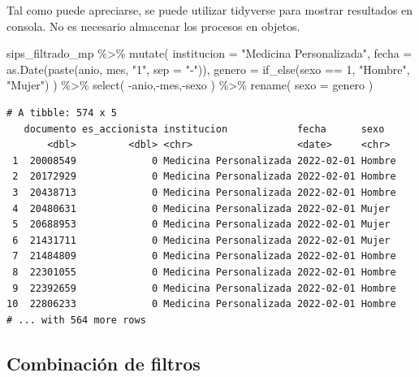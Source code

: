 \documentclass[
  letterpaper,
  DIV=11,
  numbers=noendperiod]{scrreprt}
\newenvironment{Shaded}{\begin{snugshade}}{\end{snugshade}}
\newcommand{\AttributeTok}[1]{\textcolor[rgb]{0.40,0.45,0.13}{#1}}
\newcommand{\DecValTok}[1]{\textcolor[rgb]{0.68,0.00,0.00}{#1}}
\newcommand{\FunctionTok}[1]{\textcolor[rgb]{0.28,0.35,0.67}{#1}}
\newcommand{\NormalTok}[1]{\textcolor[rgb]{0.00,0.23,0.31}{#1}}
\newcommand{\SpecialCharTok}[1]{\textcolor[rgb]{0.37,0.37,0.37}{#1}}
\newcommand{\StringTok}[1]{\textcolor[rgb]{0.13,0.47,0.30}{#1}}
\begin{document}
Tal como puede apreciarse, se puede utilizar tidyverse para mostrar
resultados en consola. No es necesario almacenar los procesos en
objetos.

\begin{Shaded}
\begin{Highlighting}[]
\NormalTok{sips\_filtrado\_mp }\SpecialCharTok{\%\textgreater{}\%} 
  \FunctionTok{mutate}\NormalTok{(}
    \AttributeTok{institucion =} \StringTok{"Medicina Personalizada"}\NormalTok{,}
    \AttributeTok{fecha =} \FunctionTok{as.Date}\NormalTok{(}\FunctionTok{paste}\NormalTok{(anio, mes, }\StringTok{"1"}\NormalTok{, }\AttributeTok{sep =} \StringTok{"{-}"}\NormalTok{)),}
    \AttributeTok{genero =} \FunctionTok{if\_else}\NormalTok{(sexo }\SpecialCharTok{==} \DecValTok{1}\NormalTok{, }\StringTok{"Hombre"}\NormalTok{, }\StringTok{"Mujer"}\NormalTok{)}
\NormalTok{  ) }\SpecialCharTok{\%\textgreater{}\%} 
  \FunctionTok{select}\NormalTok{(}
    \SpecialCharTok{{-}}\NormalTok{anio,}\SpecialCharTok{{-}}\NormalTok{mes,}\SpecialCharTok{{-}}\NormalTok{sexo}
\NormalTok{  ) }\SpecialCharTok{\%\textgreater{}\%} 
  \FunctionTok{rename}\NormalTok{(}
    \AttributeTok{sexo =}\NormalTok{ genero}
\NormalTok{  ) }
\end{Highlighting}
\end{Shaded}

\begin{verbatim}
# A tibble: 574 x 5
   documento es_accionista institucion            fecha      sexo  
       <dbl>         <dbl> <chr>                  <date>     <chr> 
 1  20008549             0 Medicina Personalizada 2022-02-01 Hombre
 2  20172929             0 Medicina Personalizada 2022-02-01 Hombre
 3  20438713             0 Medicina Personalizada 2022-02-01 Hombre
 4  20480631             0 Medicina Personalizada 2022-02-01 Mujer 
 5  20688953             0 Medicina Personalizada 2022-02-01 Mujer 
 6  21431711             0 Medicina Personalizada 2022-02-01 Mujer 
 7  21484809             0 Medicina Personalizada 2022-02-01 Hombre
 8  22301055             0 Medicina Personalizada 2022-02-01 Hombre
 9  22392659             0 Medicina Personalizada 2022-02-01 Hombre
10  22806233             0 Medicina Personalizada 2022-02-01 Hombre
# ... with 564 more rows
\end{verbatim}

\hypertarget{combinaciuxf3n-de-filtros}{%
\subsection{Combinación de filtros}\label{combinaciuxf3n-de-filtros}}
\end{document}
